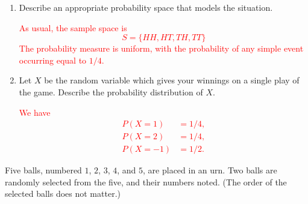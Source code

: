 \documentclass[12pt,reqno]{amsart}
\begin{document}
\medskip
\begin{enumerate}
\item Describe an appropriate probability space that models the situation.
    
\bigskip
\textcolor{red}{As usual, the sample space is
    	\[
	S = \{HH,HT,TH,TT\}
	\]
The probability measure is uniform, with the probability of any simple event occurring equal to $1/4$.}
\bigskip

\item Let $X$ be the random variable which gives your winnings on a single play of the game. Describe the probability distribution of $X$.
    
\bigskip
\textcolor{red}{We have
	\begin{align*}
	P(X=1) &= 1/4, \\
	P(X=2) &= 1/4, \\
	P(X=-1) &= 1/2.
	\end{align*}}
\end{enumerate}























\bigskip
\prob Five balls, numbered $1$, $2$, $3$, $4$, and $5$, are placed in an urn. Two balls are randomly selected from the five, and their numbers noted. (The order of the selected balls does not matter.)
\end{document}
